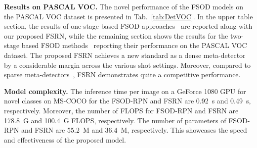 \documentclass[10pt,twocolumn,letterpaper]{article}
\begin{document}
\textbf{Results on PASCAL VOC.} The novel performance of the FSOD models on the PASCAL VOC dataset is presented in Tab.~\ref{tab:DetVOC}. In the upper table section, the results of one-stage based FSOD approaches~\cite{FSRW, MetaDet, once} are reported along with our proposed FSRN, while the remaining section shows the results for the two-stage based FSOD methods~\cite{LSTD, MetaDet, MetaRCNN, TFA, MPSR, FsDetView, defrcn} reporting their performance on the PASCAL VOC dataset. The proposed FSRN achieves a new standard as a dense meta-detector by a considerable margin across the various shot settings. Moreover, compared to sparse meta-detectors~\cite{MetaRCNN, MetaDet, FsDetView}, FSRN demonstrates quite a competitive performance. 


\textbf{Model complexity.} The inference time per image on a GeForce 1080 GPU for novel classes on MS-COCO for the FSOD-RPN and FSRN are \SI{0.92}{\s} and  \SI{0.49}{\s}, respectively. Moreover, the number of FLOPS for FSOD-RPN and FSRN are  \SI{178.8}{G} and \SI{100.4}{G} FLOPS, respectively. The number of parameters of FSOD-RPN and FSRN are \SI{55.2}{M} and \SI{36.4}{M}, respectively. This showcases the speed and effectiveness of the proposed model.

\begin{table*}[t!]\caption{Ablation study on $10$-shot MS-COCO. Every row represents an incremental contribution. }
\label{table:novel_abl}
\begin{center}
\end{center}
\vspace{-2em}
\end{table*} 
\end{document}
